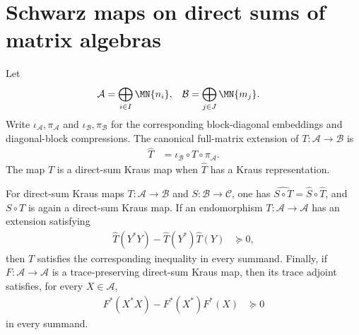 \section{Schwarz maps on direct sums of matrix algebras}

\begin{definition}
    \label{def:kraus_map_between_direct_sums}
    \leanok
    Let
    \begin{align}
        \mathcal A
         & =\bigoplus_{i\in I}\MN{n_i},
         &
        \mathcal B
         & =\bigoplus_{j\in J}\MN{m_j}.
        \notag
    \end{align}
    Write $\iota_{\mathcal A},\pi_{\mathcal A}$ and $\iota_{\mathcal B},\pi_{\mathcal B}$ for the corresponding
    block-diagonal embeddings and diagonal-block compressions. The canonical full-matrix extension of $T:\mathcal A\to\mathcal B$ is
    \begin{align}
        \widehat T
         & =\iota_{\mathcal B}\circ T\circ\pi_{\mathcal A}.
        \label{eq:spectral_ds_kraus_extension}
    \end{align}
    The map $T$ is a direct-sum Kraus map when $\widehat T$ has a Kraus representation.
\end{definition}

\begin{lemma}
    \label{lem:direct_sum_kraus_composition_schwarz}
    \leanok
    For direct-sum Kraus maps $T:\mathcal A\to\mathcal B$ and $S:\mathcal B\to\mathcal C$, one has
    $\widehat{S\circ T}=\widehat S\circ\widehat T$, and $S\circ T$ is again a direct-sum Kraus map. If an endomorphism
    $T:\mathcal A\to\mathcal A$ has an extension satisfying
    \begin{align}
        \widehat T(Y^*Y)-\widehat T(Y^*)\widehat T(Y)
         & \succeq0,
        \label{eq:spectral_ds_extension_schwarz}
    \end{align}
    then $T$ satisfies the corresponding inequality in every summand. Finally, if $F:\mathcal A\to\mathcal A$ is a trace-preserving direct-sum
    Kraus map, then its trace adjoint satisfies, for every $X\in\mathcal A$,
    \begin{align}
        F^*(X^*X)-F^*(X^*)F^*(X)
         & \succeq0
        \label{eq:spectral_ds_adjoint_schwarz}
    \end{align}
    in every summand.
\end{lemma}

